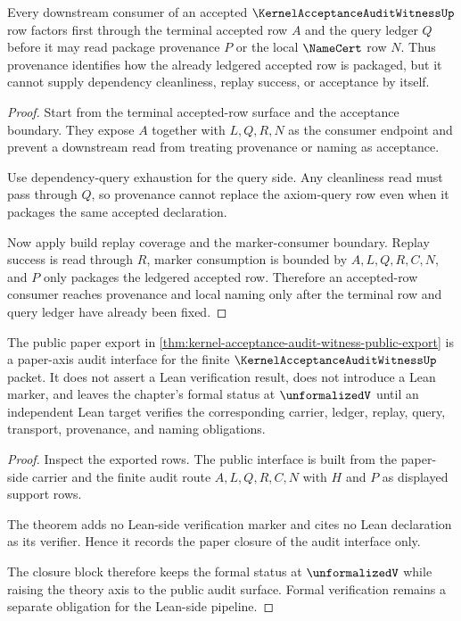 \begin{theorem}
\label{thm:kernel-acceptance-audit-witness-accepted-row-consumer-boundary}
Every downstream consumer of an accepted $\KernelAcceptanceAuditWitnessUp$ row factors first through the terminal accepted row $A$ and the query ledger $Q$ before it may read package provenance $P$ or the local $\NameCert$ row $N$. Thus provenance identifies how the already ledgered accepted row is packaged, but it cannot supply dependency cleanliness, replay success, or acceptance by itself.
\end{theorem}
\begin{proof}
Start from the terminal accepted-row surface and the acceptance boundary. They expose $A$ together with $L,Q,R,N$ as the consumer endpoint and prevent a downstream read from treating provenance or naming as acceptance.

Use dependency-query exhaustion for the query side. Any cleanliness read must pass through $Q$, so provenance cannot replace the axiom-query row even when it packages the same accepted declaration.

Now apply build replay coverage and the marker-consumer boundary. Replay success is read through $R$, marker consumption is bounded by $A,L,Q,R,C,N$, and $P$ only packages the ledgered accepted row. Therefore an accepted-row consumer reaches provenance and local naming only after the terminal row and query ledger have already been fixed.
\end{proof}

\begin{theorem}
\label{thm:kernel-acceptance-audit-witness-formal-axis-separation}
The public paper export in \autoref{thm:kernel-acceptance-audit-witness-public-export} is a paper-axis audit interface for the finite $\KernelAcceptanceAuditWitnessUp$ packet. It does not assert a Lean verification result, does not introduce a Lean marker, and leaves the chapter's formal status at $\unformalizedV$ until an independent Lean target verifies the corresponding carrier, ledger, replay, query, transport, provenance, and naming obligations.
\end{theorem}
\begin{proof}
Inspect the exported rows. The public interface is built from the paper-side carrier and the finite audit route $A,L,Q,R,C,N$ with $H$ and $P$ as displayed support rows.

The theorem adds no Lean-side verification marker and cites no Lean declaration as its verifier. Hence it records the paper closure of the audit interface only.

The closure block therefore keeps the formal status at $\unformalizedV$ while raising the theory axis to the public audit surface. Formal verification remains a separate obligation for the Lean-side pipeline.
\end{proof}

